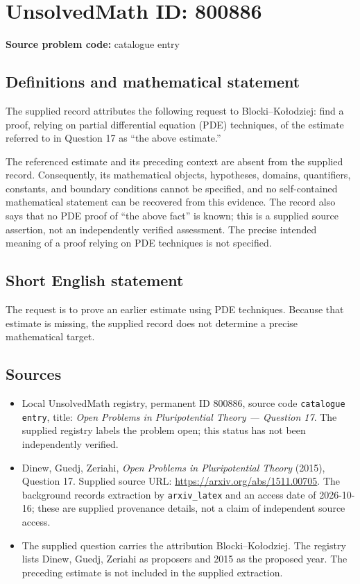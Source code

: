 \documentclass[11pt]{article}
\begin{document}
\section*{UnsolvedMath ID: 800886}
\textbf{Source problem code:} catalogue entry
\subsection{Definitions and mathematical statement}
The supplied record attributes the following request to Blocki--Ko\l{}odziej: find a proof, relying on partial differential equation (PDE) techniques, of the estimate referred to in Question 17 as ``the above estimate.''

The referenced estimate and its preceding context are absent from the supplied record. Consequently, its mathematical objects, hypotheses, domains, quantifiers, constants, and boundary conditions cannot be specified, and no self-contained mathematical statement can be recovered from this evidence. The record also says that no PDE proof of ``the above fact'' is known; this is a supplied source assertion, not an independently verified assessment. The precise intended meaning of a proof relying on PDE techniques is not specified.
\subsection{Short English statement}
The request is to prove an earlier estimate using PDE techniques. Because that estimate is missing, the supplied record does not determine a precise mathematical target.
\subsection{Sources}
\begin{itemize}
\item Local UnsolvedMath registry, permanent ID \(800886\), source code \texttt{catalogue entry}, title: \emph{Open Problems in Pluripotential Theory --- Question 17}. The supplied registry labels the problem open; this status has not been independently verified.
\item Dinew, Guedj, Zeriahi, \emph{Open Problems in Pluripotential Theory} (2015), Question 17. Supplied source URL: \url{https://arxiv.org/abs/1511.00705}. The background records extraction by \texttt{arxiv\_latex} and an access date of 2026-10-16; these are supplied provenance details, not a claim of independent source access.
\item The supplied question carries the attribution Blocki--Ko\l{}odziej. The registry lists Dinew, Guedj, Zeriahi as proposers and 2015 as the proposed year. The preceding estimate is not included in the supplied extraction.
\end{itemize}
\end{document}

